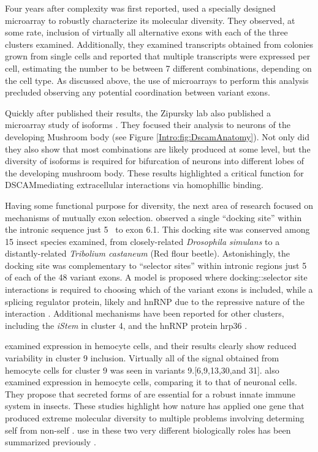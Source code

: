     Four years after \dscam{} complexity was first reported, \citep{Neves2004} used a specially designed microarray to robustly characterize its molecular diversity. They observed, at some rate, inclusion of virtually all alternative exons with each of the three clusters examined. Additionally, they examined \dscam{} transcripts obtained from colonies grown from single cells and reported that multiple \dscam{} transcripts were expressed per cell, estimating the number to be between 7 different combinations, depending on the cell type. As discussed above, the use of microarrays to perform this analysis precluded observing any potential coordination between variant exons.

    Quickly after \citet{Neves2004} published their results, the Zipursky lab also published a microarray study of \dscam{} isoforms \citep{Zhan2004}. They focused their analysis to neurons of the developing Mushroom body (see Figure \ref{Intro:fig:DscamAnatomy}). Not only did they also show that most \dscam{} combinations are likely produced at some level, but the diversity of isoforms is required for bifurcation of neurons into different lobes of the developing mushroom body. These results highlighted a critical function for DSCAM\textendash mediating extracellular interactions via homophillic binding.

    Having some functional purpose for \dscam{} diversity, the next area of research focused on mechanisms of mutually exon selection. \citet{Graveley2005b} observed a single ``docking site'' within the intronic sequence just 5\textprime~ to exon 6.1. This docking site was conserved among 15 insect species examined, from closely-related \textit{Drosophila simulans} to a distantly-related \textit{Tribolium castaneum} (Red flour beetle). Astonishingly, the docking site was complementary to ``selector sites'' within intronic regions just 5\textprime~ of each of the 48 variant exons.  A model is proposed where docking::selector site interactions is required to choosing which of the variant exons is included, while a splicing regulator protein, likely and hnRNP due to the repressive nature of the interaction \citep{Graveley2000}. Additional mechanisms have been reported for other clusters, including the \textit{iStem} \citep{Kreahling2005} in cluster 4, and the hnRNP protein hrp36 \citep{Olson2007}.

    \citep{Neves2004} examined \dscam{} expression in hemocyte cells, and their results clearly show reduced variability in cluster 9 inclusion. Virtually all of the signal obtained from hemocyte cells for cluster 9 was seen in variants 9.[6,9,13,30,and 31]. \citep{Watson2005} also examined \dscam{} expression in hemocyte cells, comparing it to that of neuronal cells. They propose that secreted forms of \dscam{} are essential for a robust innate immune system in insects. These studies highlight how nature has applied one gene that produced extreme molecular diversity to multiple problems involving determing self from non-self \citep{Shi2012a, Hattori2008}. \dscam{} use in these two very different biologically roles has been summarized previously \citep{Hemani2012}. 

